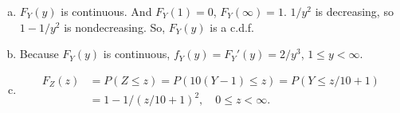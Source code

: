 \documentclass[14pt]{elegantbook}
\begin{document}
    \begin{solution}
        \begin{enumerate}[(a)]
            \item $F_Y(y)$ is continuous. And $F_Y(1)=0$, $F_Y(\infty)=1$. $1/y^2$ is decreasing, so $1-1/y^2$ is nondecreasing. So, $F_Y(y)$ is a c.d.f.
            \item Because $F_Y(y)$ is continuous, $f_Y(y)=F_Y'(y)=2/y^3$, $1\leq y<\infty$. 
            \item \begin{align*}
                F_Z(z)&=P(Z\leq z)=P(10(Y-1)\leq z)=P(Y\leq z/10+1)\\
                &=1-1/(z/10+1)^2, \quad 0\leq z<\infty. 
            \end{align*}
        \end{enumerate}
    \end{solution}
\end{document}
